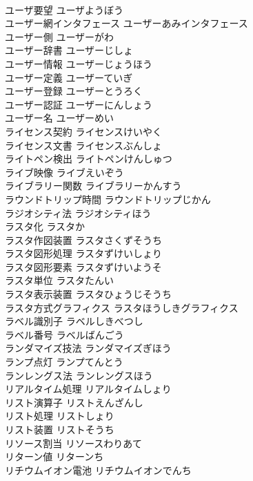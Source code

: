 \documentclass[8pt]{extreport}
\begin{document}
\begin{CJK}{UTF8}{min}
\\	ユーザ要望	ユーザようぼう	
\\	ユーザー網インタフェース	ユーザーあみインタフェース	
\\	ユーザー側	ユーザーがわ	
\\	ユーザー辞書	ユーザーじしょ	
\\	ユーザー情報	ユーザーじょうほう	
\\	ユーザー定義	ユーザーていぎ	
\\	ユーザー登録	ユーザーとうろく	
\\	ユーザー認証	ユーザーにんしょう	
\\	ユーザー名	ユーザーめい	
\\	ライセンス契約	ライセンスけいやく	
\\	ライセンス文書	ライセンスぶんしょ	
\\	ライトペン検出	ライトペンけんしゅつ	
\\	ライブ映像	ライブえいぞう	
\\	ライブラリー関数	ライブラリーかんすう	
\\	ラウンドトリップ時間	ラウンドトリップじかん	
\\	ラジオシティ法	ラジオシティほう	
\\	ラスタ化	ラスタか	
\\	ラスタ作図装置	ラスタさくずそうち	
\\	ラスタ図形処理	ラスタずけいしょり	
\\	ラスタ図形要素	ラスタずけいようそ	
\\	ラスタ単位	ラスタたんい	
\\	ラスタ表示装置	ラスタひょうじそうち	
\\	ラスタ方式グラフィクス	ラスタほうしきグラフィクス	
\\	ラベル識別子	ラベルしきべつし	
\\	ラベル番号	ラベルばんごう	
\\	ランダマイズ技法	ランダマイズぎほう	
\\	ランプ点灯	ランプてんとう	
\\	ランレングス法	ランレングスほう	
\\	リアルタイム処理	リアルタイムしょり	
\\	リスト演算子	リストえんざんし	
\\	リスト処理	リストしょり	
\\	リスト装置	リストそうち	
\\	リソース割当	リソースわりあて	
\\	リターン値	リターンち	
\\	リチウムイオン電池	リチウムイオンでんち	

\end{CJK}
\end{document}
